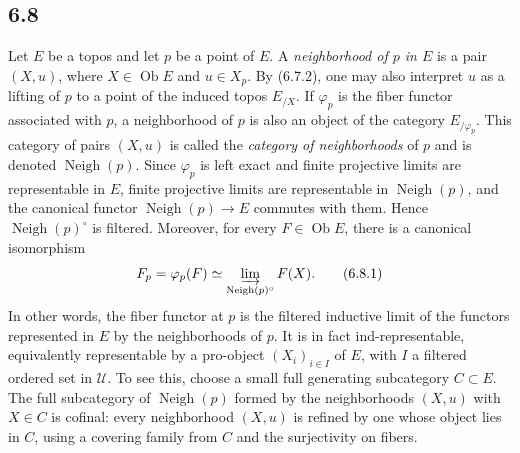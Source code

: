 \documentclass[11pt]{article}
\newcommand{\U}{\mathcal{U}}
\newcommand{\Ob}{\operatorname{Ob}}
\newcommand{\Vvois}{\operatorname{Neigh}}
\providecommand{\Ob}{\operatorname{Ob}}
\begin{document}
\subsection*{6.8}
Let \(E\) be a topos and let \(p\) be a point of \(E\). A \emph{neighborhood of \(p\) in \(E\)} is a pair \((X,u)\), where \(X\in\Ob E\) and \(u\in X_p\). By (6.7.2), one may also interpret \(u\) as a lifting of \(p\) to a point of the induced topos \(E_{/X}\). If \(\varphi_p\) is the fiber functor associated with \(p\), a neighborhood of \(p\) is also an object of the category \(E_{/\varphi_p}\). This category of pairs \((X,u)\) is called the \emph{category of neighborhoods} of \(p\) and is denoted \(\Vvois(p)\). Since \(\varphi_p\) is left exact and finite projective limits are representable in \(E\), finite projective limits are representable in \(\Vvois(p)\), and the canonical functor \(\Vvois(p)\to E\) commutes with them. Hence \(\Vvois(p)^\circ\) is filtered. Moreover, for every \(F\in\Ob E\), there is a canonical isomorphism
\begin{equation*}
F_p=\varphi_p(F)\simeq\varinjlim_{\Vvois(p)^\circ}F(X).\tag{6.8.1}
\end{equation*}
In other words, the fiber functor at \(p\) is the filtered inductive limit of the functors represented in \(E\) by the neighborhoods of \(p\). It is in fact ind-representable, equivalently representable by a pro-object \((X_i)_{i\in I}\) of \(E\), with \(I\) a filtered ordered set in \(\U\). To see this, choose a small full generating subcategory \(C\subset E\). The full subcategory of \(\Vvois(p)\) formed by the neighborhoods \((X,u)\) with \(X\in C\) is cofinal: every neighborhood \((X,u)\) is refined by one whose object lies in \(C\), using a covering family from \(C\) and the surjectivity on fibers.
\end{document}

